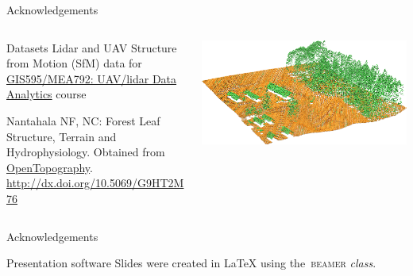 \documentclass[xcolor={dvipsnames,usenames},beamer,aspectratio=169]{beamer}
\newcommand{\backupend}{
   \setcounter{framenumber}{\value{finalframe}}
}
\begin{document}
\begin{frame}{Acknowledgements}

\begin{columns}
\begin{column}{0.48\textwidth}

\begin{block}{Datasets}
\footnotesize
Lidar and UAV Structure from Motion (SfM) data for
\href{http://ncsu-osgeorel.github.io/uav-lidar-analytics-course/}%
  {GIS595/MEA792: UAV/lidar Data Analytics} course

\smallskip

Nantahala NF, NC: Forest Leaf Structure, Terrain and Hydrophysiology.
Obtained from \href{http://www.opentopography.org/}{OpenTopography}.
\url{http://dx.doi.org/10.5069/G9HT2M76}
\end{block}

\end{column}
\begin{column}{0.47\textwidth}

\begin{center}
  \includegraphics[width=\textwidth]{lidar_secref_3d}
\end{center}

\end{column}
\end{columns}

\end{frame}

\begin{frame}{Acknowledgements}

\begin{block}{Presentation software}
\Huge
\textrm{Slides were created in \LaTeX{} using the~\textsc{beamer} \textit{class}.}
\end{block}

\end{frame}

\backupend
\end{document}
